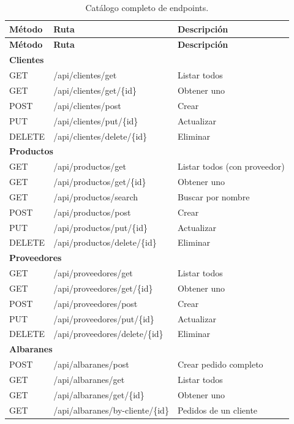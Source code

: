 \documentclass[12pt,twoside,titlepage]{report}
\begin{document}
\begin{longtable}{llp{6cm}}
  \caption{Catálogo completo de endpoints.} \label{tab:endpoints_full} \\
  \toprule
  \textbf{Método} & \textbf{Ruta} & \textbf{Descripción} \\
  \midrule
  \endfirsthead
  \toprule
  \textbf{Método} & \textbf{Ruta} & \textbf{Descripción} \\
  \midrule
  \endhead
  \multicolumn{3}{l}{\textbf{Clientes}} \\
  GET    & /api/clientes/get     & Listar todos \\
  GET    & /api/clientes/get/\{id\} & Obtener uno \\
  POST   & /api/clientes/post    & Crear \\
  PUT    & /api/clientes/put/\{id\} & Actualizar \\
  DELETE & /api/clientes/delete/\{id\} & Eliminar \\
  \midrule
  \multicolumn{3}{l}{\textbf{Productos}} \\
  GET    & /api/productos/get    & Listar todos (con proveedor) \\
  GET    & /api/productos/get/\{id\} & Obtener uno \\
  GET    & /api/productos/search & Buscar por nombre \\
  POST   & /api/productos/post   & Crear \\
  PUT    & /api/productos/put/\{id\} & Actualizar \\
  DELETE & /api/productos/delete/\{id\} & Eliminar \\
  \midrule
  \multicolumn{3}{l}{\textbf{Proveedores}} \\
  GET    & /api/proveedores/get  & Listar todos \\
  GET    & /api/proveedores/get/\{id\} & Obtener uno \\
  POST   & /api/proveedores/post & Crear \\
  PUT    & /api/proveedores/put/\{id\} & Actualizar \\
  DELETE & /api/proveedores/delete/\{id\} & Eliminar \\
  \midrule
  \multicolumn{3}{l}{\textbf{Albaranes}} \\
  POST   & /api/albaranes/post   & Crear pedido completo \\
  GET    & /api/albaranes/get    & Listar todos \\
  GET    & /api/albaranes/get/\{id\} & Obtener uno \\
  GET    & /api/albaranes/by-cliente/\{id\} & Pedidos de un cliente \\

\end{longtable}
\end{document}
